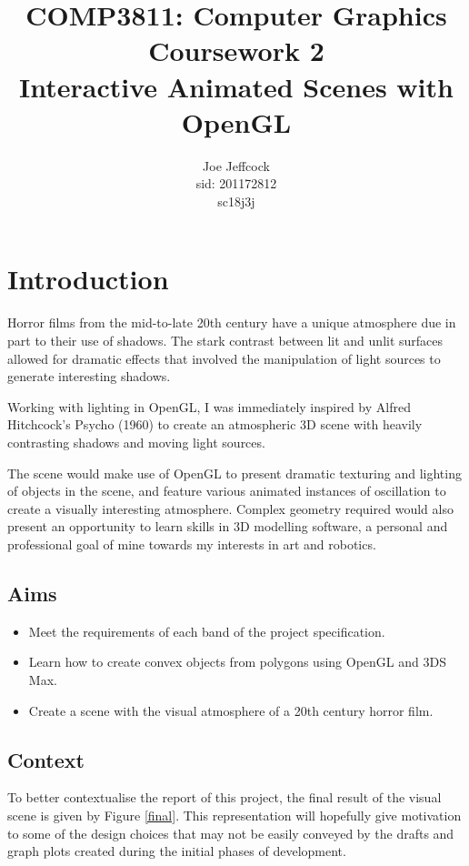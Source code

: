 \documentclass{article}
\title{COMP3811: Computer Graphics\\Coursework 2\\Interactive Animated Scenes with OpenGL}
\author{Joe Jeffcock\\sid: 201172812\\sc18j3j}
\begin{document}
	\hypersetup{linkcolor=black}
	\maketitle
	\tableofcontents
	\hypersetup{linkcolor=blue, urlcolor=cyan}

	\clearpage
	\section{Introduction}
	Horror films from the mid-to-late 20th century have a unique atmosphere due in part to their use of shadows.
	The stark contrast between lit and unlit surfaces allowed for dramatic effects that involved the manipulation of
	light sources to generate interesting shadows.
	
	\bigskip
	
	Working with lighting in OpenGL, I was immediately inspired by Alfred Hitchcock's Psycho (1960) to create an
	atmospheric 3D scene with heavily contrasting shadows and moving light sources.
	
	\bigskip
	
	The scene would make use of OpenGL to present dramatic texturing and lighting of objects in the scene,
	and feature various animated instances of oscillation to create a visually interesting atmosphere. Complex geometry
	required would also present an opportunity to learn skills in 3D modelling software, a personal and
	professional goal of mine towards my interests in art and robotics.
	
	
	\subsection{Aims}
	\begin{itemize}
		\item Meet the requirements of each band of the project specification.
		\item Learn how to create convex objects from polygons using OpenGL and 3DS Max.
		\item Create a scene with the visual atmosphere of a 20th century horror film.
	\end{itemize}
	\subsection{Context}
	To better contextualise the report of this project, the final result of the visual scene
	is given by Figure \ref{final}. %
	This representation will hopefully give motivation to some of the design choices that may not be easily
	conveyed by the drafts and graph plots created during the initial phases of development.
	
\end{document}

